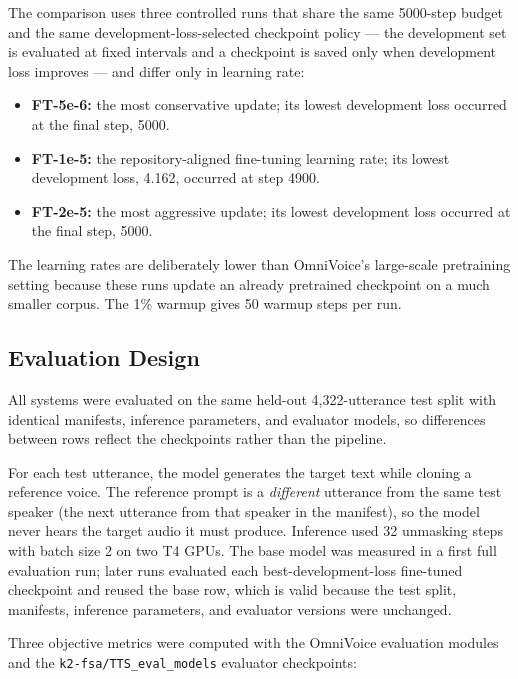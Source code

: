 \documentclass[sigconf,nonacm]{acmart}
\begin{document}
The comparison uses three controlled runs that share the same 5000-step budget and the same development-loss-selected checkpoint policy --- the development set is evaluated at fixed intervals and a checkpoint is saved only when development loss improves --- and differ only in learning rate:

\begin{itemize}
  \item \textbf{FT-5e-6:} the most conservative update; its lowest development loss occurred at the final step, 5000.
  \item \textbf{FT-1e-5:} the repository-aligned fine-tuning learning rate; its lowest development loss, 4.162, occurred at step 4900.
  \item \textbf{FT-2e-5:} the most aggressive update; its lowest development loss occurred at the final step, 5000.
\end{itemize}

The learning rates are deliberately lower than OmniVoice's large-scale pretraining setting because these runs update an already pretrained checkpoint on a much smaller corpus. The 1\% warmup gives 50 warmup steps per run.

\subsection{Evaluation Design}

All systems were evaluated on the same held-out 4,322-utterance test split with identical manifests, inference parameters, and evaluator models, so differences between rows reflect the checkpoints rather than the pipeline.

For each test utterance, the model generates the target text while cloning a reference voice. The reference prompt is a \emph{different} utterance from the same test speaker (the next utterance from that speaker in the manifest), so the model never hears the target audio it must produce. Inference used 32 unmasking steps with batch size 2 on two T4 GPUs. The base model was measured in a first full evaluation run; later runs evaluated each best-development-loss fine-tuned checkpoint and reused the base row, which is valid because the test split, manifests, inference parameters, and evaluator versions were unchanged.

Three objective metrics were computed with the OmniVoice evaluation modules and the \texttt{k2-fsa/TTS\_eval\_models} evaluator checkpoints:
\end{document}

